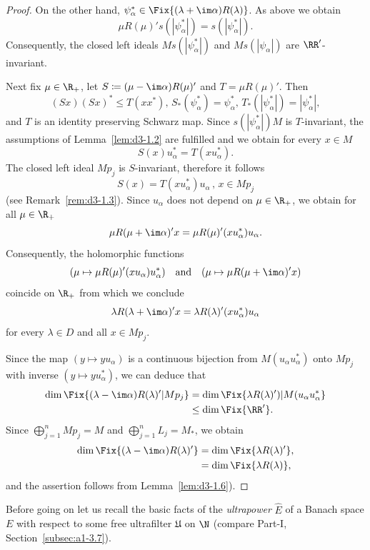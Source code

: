 \begin{proof}
On the other hand, $\psi_{\alpha}^{*} \in \Fix  {(\lambda + \im\alpha)R(\lambda)}$.
As above we obtain
\[
\mu R(\mu)'s(|\psi_{\alpha}^{*}|) = s(|\psi_{\alpha}^{*}|) .
\]
Consequently, the closed left ideals $Ms(|\psi_{\alpha}^{*}|)$ and $Ms(|\psi_{\alpha}|)$ are $\RR'$-invariant.

Next fix $\mu \in \R_{+}$, let $S \coloneqq (\mu - \im\alpha)R(\mu)'$ and $T = \mu R(\mu)'$.
Then 
%
\[
	(Sx)(Sx)^{*} \leq T(xx^{*}), \,
	S_{*}(\psi_{\alpha}^{*}) = \psi_{\alpha}^{*}, \,
	T_{*}(|\psi_{\alpha}^{*}|) = |\psi_{\alpha}^{*}|, 
\]
%
and $T$ is an identity preserving Schwarz map.
Since $s(|\psi_{\alpha}^{*}|)M$ is $T$-invariant, the assumptions of Lemma~\ref{lem:d3-1.2} are fulfilled and we obtain for every $x \in M$
\[
	S(x)u_{\alpha}^{*} = T(xu_{\alpha}^{*}) .
\]
The closed left ideal $Mp_{j}$ is $S$-invariant, therefore it follows
\[
S(x) = T(xu_{\alpha}^{*})u_{\alpha} \, , \, x \in Mp_{j}
\]
(see Remark~\ref{rem:d3-1.3}).
Since $u_{\alpha}$ does not depend on $\mu \in \R_{+}$, we obtain for all $\mu \in \R_{+}$
\[
\mu R(\mu+\im\alpha)'x = \mu R(\mu)'(xu_{\alpha}^{*})u_{\alpha}.
\]
Consequently, the holomorphic functions 
%
\[
	(\mu \mapsto \mu R(\mu)'(x u_{\alpha})u_{\alpha}^{*})
	\quad \text{and} \quad
	(\mu \mapsto \mu R(\mu+\im\alpha)'x)
\]
%
coincide on $\R_{+}$ from which we conclude
\[
\lambda R(\lambda+\im\alpha)'x = \lambda R(\lambda)'(xu_{\alpha}^{*})u_{\alpha}
\]
for every $\lambda \in D$ and all $x \in Mp_{j}$.

Since the map $(y \mapsto y u_{\alpha})$ is a continuous bijection from $M(u_{\alpha}u_{\alpha}^{*})$ onto $Mp_{j}$ with inverse $(y \mapsto y u_{\alpha}^{*})$, we can deduce that
\begin{align*}
\dim \Fix  {(\lambda-\im\alpha)R(\lambda)'|Mp_{j}} 
	&= \dim \Fix  {\lambda R(\lambda)')|M(u_{\alpha}u_{\alpha}^{*}}  \\
 	&\leq \dim \Fix  {\RR'} .
\end{align*}
Since $\bigoplus_{j=1}^{n} Mp_{j} = M$ and $\bigoplus_{j=1}^{n} L_{j} = M_{*}$, we obtain
\begin{align*}
\dim \Fix  {(\lambda - \im\alpha)R(\lambda)'} &= \dim \Fix{\lambda R(\lambda)'} , \\
		&= \dim \Fix  {\lambda R(\lambda)} ,
\end{align*}
and the assertion follows from Lemma~\ref{lem:d3-1.6}).
\end{proof}
Before going on let us recall the basic facts of the \emph{ultrapower} $\widehat{E}$ of a Banach space $E$ with respect to some free ultrafilter $\mathfrak{U}$ on $\N $ (compare Part-I, Section~\ref{subsec:a1-3.7}).
